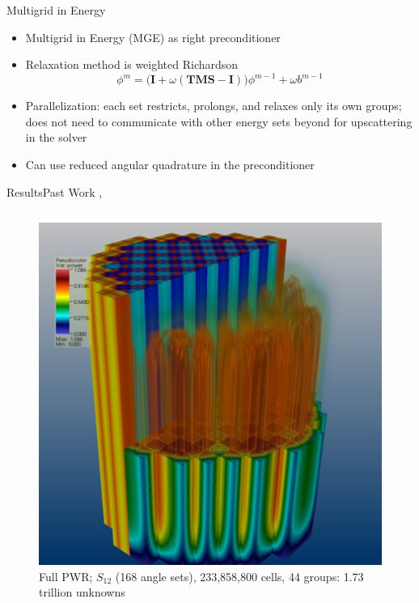 \documentclass[final]{beamer}
\newcommand{\ve}[1]{\ensuremath{\mathbf{#1}}}
\begin{document}
\begin{frame}{}
\begin{columns}[t]
\begin{column}{.3\linewidth}
\begin{block}{\large Multigrid in Energy \cite{Slaybaugh2013}}
        \begin{itemize}
			\item{Multigrid in Energy (MGE) as right preconditioner}
			\item{Relaxation method is weighted Richardson}
			\begin{equation}
              \phi^{m} = \bigr(\ve{I} + \omega(\ve{TMS} - \ve{I})\bigl)\phi^{m-1}
               + \omega b^{m-1}
            \label{eq:relax}
            \end{equation} 
			\item{Parallelization: each set restricts, prolongs, and relaxes only
			 its own groups; does not need to communicate with other energy sets
			 beyond for upscattering in the solver}
			\item{Can use reduced angular quadrature in the preconditioner}
			\end{itemize}
        	\end{block}
			\vfill
		\begin{block}{\large Results\textemdash Past Work 
		              \cite{Slaybaugh2012}, \cite{Slaybaugh2013}}
\begin{columns}
	\begin{figure}[h!]
	\includegraphics[width=5in]{../figs/denovo-pwr.png}
	\caption{\footnotesize Full PWR; $S_{12}$ (168 angle sets), 233,858,800 
	         cells, 44 groups: 1.73 trillion unknowns}

\end{figure}
\end{columns}
\end{block}
\end{column}
\end{columns}
\end{frame}
\end{document}

